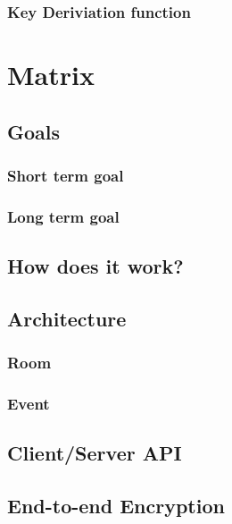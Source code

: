 \subsubsection{Key Deriviation function}

\section{Matrix} %

\subsection{Goals}

\subsubsection{Short term goal}

\subsubsection{Long term goal}

\subsection{How does it work?}

\subsection{Architecture}

\subsubsection{Room}

\subsubsection{Event}


\subsection{Client/Server API}

\subsection{End-to-end Encryption}

